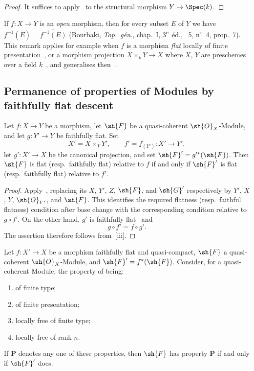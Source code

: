 \begin{proof}
It suffices to apply~ to the structural morphism $Y\to\Spec(k)$.
\end{proof}

\begin{remark}[2.4.11]
\label{IV.2.4.11}
If $f:X\to Y$ is an \emph{open} morphism, then for every subset $E$ of $Y$ we have $f^{-1}(\overline{E})=\overline{f^{-1}(E)}$ (Bourbaki, \emph{Top.~g\'{e}n.}, chap.~I, 3\textsuperscript{e}~\'{e}d., \textsection~5, n\textsuperscript{o}~4, prop.~7).
This remark applies for example when $f$ is a morphism \emph{flat} locally of finite presentation~, or a morphism projection $X\times_k Y\to X$ where $X$, $Y$ are preschemes over a field $k$~, and generalises then~.
\end{remark}

\subsection{Permanence of properties of Modules by faithfully flat descent}
\label{subsection:IV.2.5}

\begin{proposition}[2.5.1]
\label{IV.2.5.1}
Let $f:X\to Y$ be a morphism, let $\sh{F}$ be a quasi-coherent
$\sh{O}_X$-Module, and let $g:Y'\to Y$ be faithfully flat. Set
\[
  X'=X\times_Y Y',\qquad
  f'=f_{(Y')}:X'\to Y',
\]
let $g':X'\to X$ be the canonical projection, and set
$\sh{F}'=g'^*(\sh{F})$. Then $\sh{F}$ is flat \textnormal{(}resp.\
faithfully flat\textnormal{)} relative to $f$ if and only if $\sh{F}'$ is
flat \textnormal{(}resp.\ faithfully flat\textnormal{)} relative to $f'$.
\end{proposition}

\begin{proof}
Apply~, replacing its $X$, $Y'$, $Z$, $\sh{F}$, and
$\sh{G}'$ respectively by $Y'$, $X$, $Y$, $\sh{O}_{Y'}$, and $\sh{F}$.
This identifies the required flatness \textnormal{(}resp.\ faithful
flatness\textnormal{)} condition after base change with the corresponding
condition relative to $g\circ f'$. On the other hand, $g'$ is faithfully
flat~\sref{IV.2.2.13} and
\[
  g\circ f'=f\circ g'.
\]
The assertion therefore follows from~[iii].
\end{proof}

\begin{proposition}[2.5.2]
\label{IV.2.5.2}
Let $f:X'\to X$ be a morphism faithfully flat and quasi-compact,
$\sh{F}$ a quasi-coherent $\sh{O}_X$-Module, and
$\sh{F}'=f^*(\sh{F})$. Consider, for a quasi-coherent Module, the property
of being:
\begin{enumerate}
  \item[(i)] of finite type;
  \item[(ii)] of finite presentation;
  \item[(iii)] locally free of finite type;
  \item[(iv)] locally free of rank $n$.
\end{enumerate}
If $\mathbf{P}$ denotes any one of these properties, then $\sh{F}$ has
property $\mathbf{P}$ if and only if $\sh{F}'$ does.
\end{proposition}

